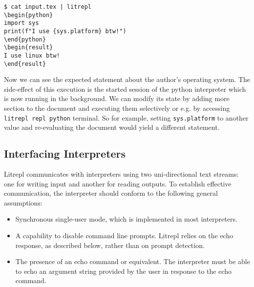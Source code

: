 \documentclass[letterpaper,12pt,twocolumn]{article}
\begin{document}
\begin{comment}
\begin{sh}
echo '\begin{verbatim}'
echo '$ cat input.tex | litrepl'
echo "sys.platform='linux'" | litrepl repl python >/dev/null
cat input.tex | litrepl
echo '\end{verbatim}'
\end{sh}
\end{comment}
\begin{verbatim}
$ cat input.tex | litrepl
\begin{python}
import sys
print(f"I use {sys.platform} btw!")
\end{python}
\begin{result}
I use linux btw!
\end{result}
\end{verbatim}

Now we can see the expected statement about the author's operating system.  The
side-effect of this execution is the started session of the python interpreter
which is now running in the background. We can modify its state by adding more
section to the document and executing them selectively or e.g. by accessing
\verb|litrepl repl python| terminal. So for example, setting \verb|sys.platform|
to another value and re-evaluating the document would yield a different
statement.


\subsection{Interfacing Interpreters}

Litrepl communicates with interpreters using two uni-directional text streams:
one for writing input and another for reading outputs. To establish effective
communication, the interpreter should conform to the following general
assumptions:

\begin{itemize}
  \item Synchronous single-user mode, which is implemented in most interpreters.
  \item A capability to disable command line prompts. Litrepl relies on the echo
        response, as described below, rather than on prompt detection.
  \item The presence of an echo command or equivalent. The interpreter must be
        able to echo an argument string provided by the user in response to the
        echo command.
\end{itemize}
\end{document}
